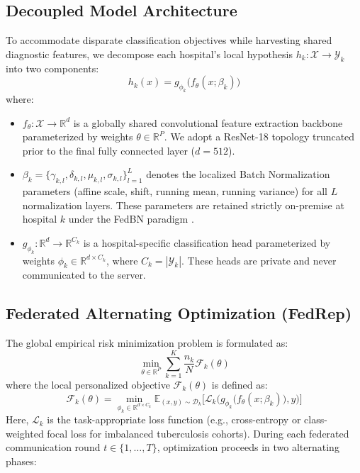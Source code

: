 \documentclass[conference]{IEEEtran}
\newcommand{\compactitems}{%
  \setlength{\itemsep}{1.2pt}%
  \setlength{\parskip}{0pt}%
  \setlength{\parsep}{0pt}%
  \setlength{\topsep}{2pt}%
  \setlength{\partopsep}{0pt}%
}
\begin{document}
\subsection{Decoupled Model Architecture}
To accommodate disparate classification objectives while harvesting shared diagnostic features, we decompose each hospital's local hypothesis $h_k: \mathcal{X} \to \mathcal{Y}_k$ into two components:
\begin{equation}
    h_k(x) = g_{\phi_k}\Big(f_\theta(x; \beta_k)\Big)
\end{equation}
where:
\begin{itemize}\compactitems
    \item $f_\theta: \mathcal{X} \to \mathbb{R}^d$ is a globally shared convolutional feature extraction backbone parameterized by weights $\theta \in \mathbb{R}^P$. We adopt a ResNet-18 topology truncated prior to the final fully connected layer ($d = 512$).
    \item $\beta_k = \{\gamma_{k,l}, \delta_{k,l}, \mu_{k,l}, \sigma_{k,l}\}_{l=1}^L$ denotes the localized Batch Normalization parameters (affine scale, shift, running mean, running variance) for all $L$ normalization layers. These parameters are retained strictly on-premise at hospital $k$ under the FedBN paradigm \cite{li2021fedbn}.
    \item $g_{\phi_k}: \mathbb{R}^d \to \mathbb{R}^{C_k}$ is a hospital-specific classification head parameterized by weights $\phi_k \in \mathbb{R}^{d \times C_k}$, where $C_k = |\mathcal{Y}_k|$. These heads are private and never communicated to the server.
\end{itemize}

\subsection{Federated Alternating Optimization (FedRep)}
The global empirical risk minimization problem is formulated as:
\begin{equation}
    \min_{\theta \in \mathbb{R}^P} \sum_{k=1}^K \frac{n_k}{N} \mathcal{F}_k(\theta)
\end{equation}
where the local personalized objective $\mathcal{F}_k(\theta)$ is defined as:
\begin{equation}
    \mathcal{F}_k(\theta) = \min_{\phi_k \in \mathbb{R}^{d \times C_k}} \mathbb{E}_{(x, y) \sim \mathcal{D}_k} \Big[ \mathcal{L}_k\Big(g_{\phi_k}\big(f_\theta(x; \beta_k)\big), y\Big) \Big]
\end{equation}
Here, $\mathcal{L}_k$ is the task-appropriate loss function (e.g., cross-entropy or class-weighted focal loss for imbalanced tuberculosis cohorts). During each federated communication round $t \in \{1, \dots, T\}$, optimization proceeds in two alternating phases:
\end{document}
